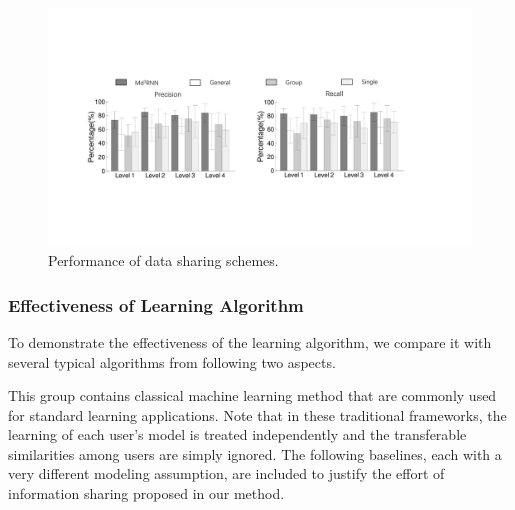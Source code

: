 \begin{figure}[h]
  \centering
  \includegraphics[width=0.8\columnwidth]{./img/performance_of_multi_division.pdf}
  \caption{Performance of data sharing schemes. }
  \label{fig:cmp_multi_division}
\end{figure}


\subsubsection{Effectiveness of \modelname Learning Algorithm}
\label{subsec:model_compare}
To demonstrate the effectiveness of the \modelname learning algorithm, we compare it with several typical algorithms from following two aspects.

This group contains classical machine learning method that are commonly used for standard learning applications. Note that in these traditional frameworks, the learning of each user's model is treated independently and the transferable similarities among users are simply ignored. The following baselines, each with a very different modeling assumption, are included to justify the effort of information sharing proposed in our method. 

